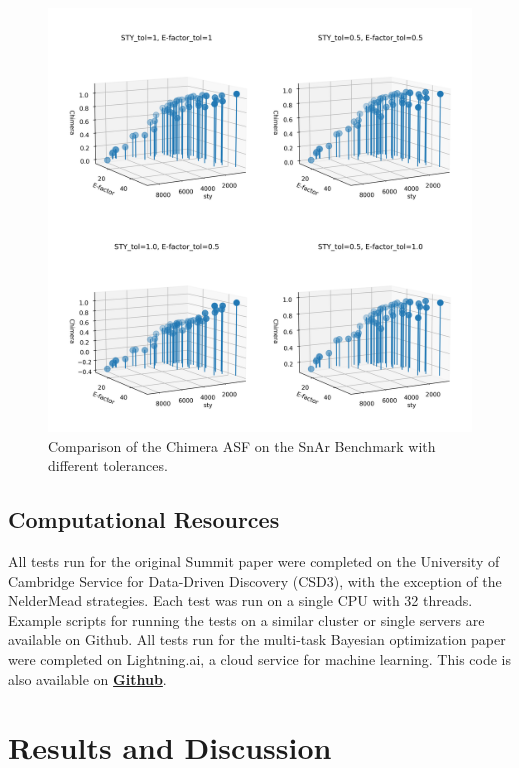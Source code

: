 \begin{figure}
    \includegraphics[width=\textwidth]{gfx/Chapter03/chimera_comparison.png}
    \caption{Comparison of the Chimera ASF on the SnAr Benchmark with different tolerances.}
    \label{fig:chimera_comparsion}
\end{figure}

\subsection{Computational Resources}
 All tests run for the original Summit paper were completed on the University of Cambridge Service for Data-Driven Discovery (CSD3), with the exception of the NelderMead strategies. Each test was run on a single CPU with 32 threads. Example scripts for running the tests on a similar cluster or single servers are available on Github. All tests run for the multi-task Bayesian optimization paper were completed on Lightning.ai, a cloud service for machine learning. This code is also available on \textbf{\href{https://github.com/sustainable-processes/multitask}{Github}}.


\section{Results and Discussion}

